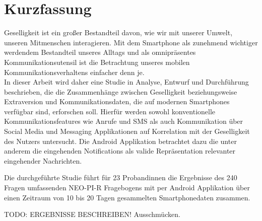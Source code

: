 
\chapter*{Kurzfassung}
\label{ch:GermanAbstract}

Geselligkeit ist ein großer Bestandteil davon, wie wir mit unserer Umwelt, unseren Mitmenschen interagieren.
Mit dem Smartphone als zunehmend wichtiger werdendem Bestandteil unseres Alltags und als omnipräsentes Kommunikationsutensil ist 
die Betrachtung unseres mobilen Kommunikationsverhaltens einfacher denn je. 
\\
In dieser Arbeit wird daher eine Studie in Analyse, Entwurf und Durchführung beschrieben, die die Zusammenhänge zwischen Geselligkeit beziehungsweise Extraversion und Kommunikationsdaten, die auf modernen Smartphones verfügbar sind, erforschen soll. 
Hierfür werden sowohl konventionelle Kommunikationsfeatures wie Anrufe und SMS als auch Kommunikation über Social Media und Messaging Applikationen auf Korrelation mit der Geselligkeit des Nutzers untersucht.
Die Android Applikation betrachtet dazu die unter anderem die eingehenden Notifications als valide Repräsentation relevanter eingehender Nachrichten.
\par
Die durchgeführte Studie führt für 23 Probandinnen die Ergebnisse des 240 Fragen umfassenden NEO-PI-R Fragebogens mit per Android Applikation über einen Zeitraum von 10 bis 20 Tagen gesammelten Smartphonedaten zusammen.
\par
TODO: ERGEBNISSE BESCHREIBEN! Ausschmücken.
 


